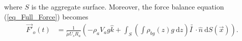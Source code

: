 where $S$ is the aggregate surface. 
Moreover, the force balance equation (\ref{eq_Full_Force}) becomes
\begin{align}
	 \vec{F'}_o(t)
	 & =
	  \frac{1}{\tilde{\mu} U_s R_a} 
	  \left(
	-   \rho_a V_a g \hat{k}
	  +
	   \int_{S} \left( 
	   \int \rho_{bg}(z) g \ \textrm{d}z 
	   \right) \bar{\bar{I \ }}  \cdot
	  \hat{n} \ \textrm{d}S (\vec{x})
	\right).
\label{eq_Full_Force_nonD}
\end{align}

